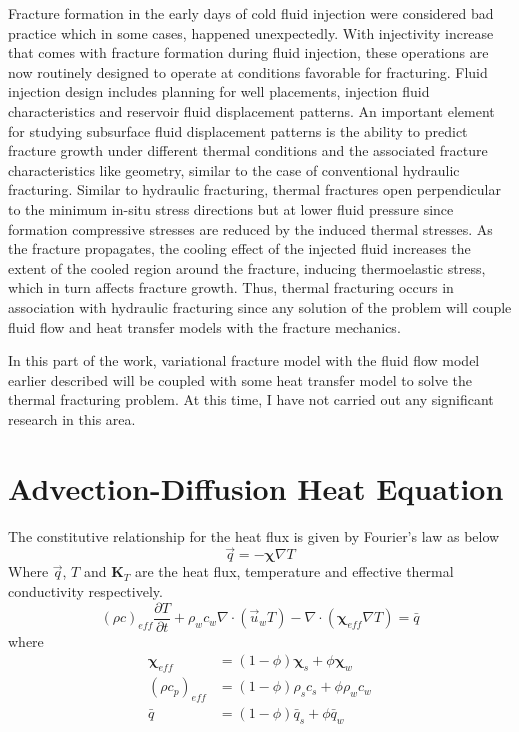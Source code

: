 \documentclass[12pt]{article}
\begin{document}
Fracture formation in the early days of cold fluid injection were considered bad practice which in some cases, happened unexpectedly. With injectivity increase that comes with fracture formation during fluid injection, these operations are now routinely designed to operate at conditions favorable for fracturing. Fluid injection design includes planning for well placements, injection fluid characteristics and reservoir fluid displacement patterns. An important element for studying subsurface fluid displacement patterns is the ability to predict fracture growth under different thermal conditions and the associated fracture characteristics like geometry, similar to the case of conventional hydraulic fracturing. Similar to hydraulic fracturing, thermal fractures open perpendicular to the minimum in-situ stress directions but at lower fluid pressure since formation compressive stresses are reduced by the induced thermal stresses.  As the fracture propagates, the cooling effect of the injected fluid increases the extent of the cooled region around the fracture, inducing thermoelastic stress, which in turn affects fracture growth. Thus, thermal fracturing occurs in association with hydraulic fracturing since any solution of the problem will couple fluid flow and heat transfer models with the fracture mechanics.

In this part of the work, variational fracture model with the fluid flow model earlier described will be coupled with some heat transfer model to solve the thermal fracturing problem. At this time, I have not carried out any significant research in this area. 


\section{Advection-Diffusion Heat Equation}

The constitutive relationship for the heat flux is given by Fourier's law as below
\begin{equation}
\vec{q}=-\mathbf{\chi}\nabla T
\end{equation}
Where $\vec{q}$, $T$ and $\mathbf{K}_T$ are the heat flux, temperature and effective thermal conductivity respectively.
%
\begin{equation}	\label{heq}
(\rho c )_{eff}\frac{\partial T}{\partial t} + \rho_wc_w\nabla\cdot(\vec{u}_w T)-\nabla\cdot(\mathbf{\chi}_{eff}\nabla T)=\bar{q}
\end{equation}
%
where
\begin{equation}
\begin{split}
\mathbf{\chi}_{eff} &= (1-\phi)\mathbf{\chi}_s +\phi\mathbf{\chi}_w		\\
(\rho c_p )_{eff} &= (1-\phi)\rho_s c_s +\phi\rho_w c_w			\\
\bar{q} &= (1-\phi)\bar{q}_s+\phi\bar{q}_w
\end{split}
\end{equation}
\end{document}
